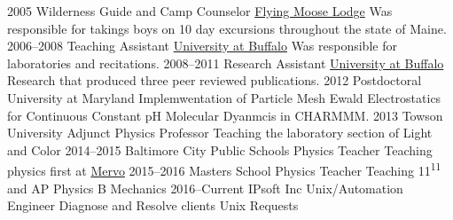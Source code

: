 

\begin{cventries}
\cventry
    {2005}
    {Wilderness Guide and Camp Counselor}
    {\href{www.flyingmooselodge.com}{Flying Moose Lodge}}
    {Was responsible for takings boys on 10 day excursions throughout the state of Maine.}
\cventry
    {2006--2008}
    {Teaching Assistant}
    {\href{www.andrews.edu}{University at Buffalo}}
    {Was responsible for laboratories and recitations.}
\cventry
    {2008--2011}
    {Research Assistant}
    {\href{www.buffalo.edu}{University at Buffalo}}
    {Research that produced three peer reviewed publications.}
\cventry
    {2012}
    {Postdoctoral}
    {University at Maryland}
    {Implemwentation of Particle Mesh Ewald Electrostatics for Continuous Constant pH Molecular Dyanmcis in CHARMMM.}
\cventry
    {2013}
    {Towson University}
    {Adjunct Physics Professor}
    {Teaching the laboratory section of Light and Color}
\cventry
    {2014--2015}
    {Baltimore City Public Schools}
    {Physics Teacher}
    {Teaching physics first at \href{http://mervo.org}{Mervo}}
\cventry
    {2015--2016}
    {Masters School}
    {Physics Teacher}
    {Teaching 11\textsuperscript{11} and AP Physics B Mechanics}
\cventry
    {2016--Current}
    {IPsoft Inc}
    {Unix/Automation Engineer}
    {Diagnose and Resolve clients Unix Requests}
\end{cventries}


